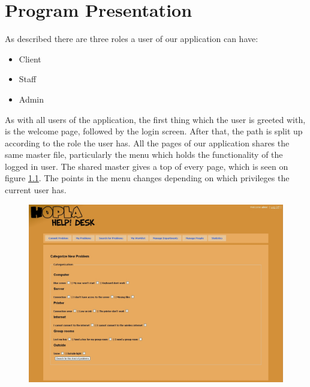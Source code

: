 \chapter{Program Presentation}
\label{chap:program_presentation}

As described there are three roles a user of our application can have:

\begin{itemize}
	\item Client
	\item Staff
	\item Admin
\end{itemize}

As with all users of the application, the first thing which the user is greeted with, is the welcome page, followed by the login screen.
After that, the path is split up according to the role the user has.
All the pages of our application shares the same master file, particularly the menu which holds the functionality of the logged in user.
The shared master gives a top of every page, which is seen on figure \ref{fig:master}.
The points in the menu changes depending on which privileges the current user has.

\begin{figure}
	\centering
		\includegraphics[width=1.00\textwidth, clip=true, trim=0cm 27.5cm 0cm 0cm]{input/implementation/program_presentation/commit.png}
	\label{fig:master}
\end{figure}

